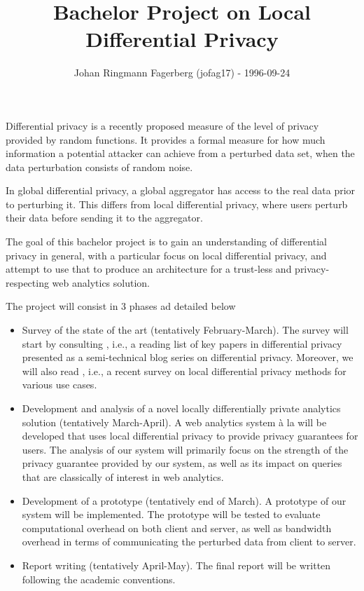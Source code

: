 \documentclass[a4paper]{article}
\title{\vspace{-2cm}Bachelor Project on Local Differential Privacy}
\author{Johan Ringmann Fagerberg (jofag17) - 1996-09-24}
\date{}
\begin{document}
\maketitle

\begin{description}[style=nextline]
    \item[Motivation] Differential privacy is a recently proposed measure of the level of privacy provided by random functions. It provides a formal measure for how much information a potential attacker can achieve from a perturbed data set, when the data perturbation consists of random noise.
    
    In global differential privacy, a global aggregator has access to the real data prior to perturbing it. This differs from local differential privacy, where users perturb their data before sending it to the aggregator.
    
    The goal of this bachelor project is to gain an understanding of 
differential privacy in general, with a particular focus on local differential 
privacy, and attempt to use that to produce an architecture for a trust-less 
and privacy-respecting web analytics solution.

\item[Plan]
    The project will consist in 3 phases ad detailed below
    \begin{itemize}
     \item Survey of the state of the art (tentatively February-March). 
The survey will start by consulting \cite{desfontain_overview}, i.e., a reading 
list of key papers in differential privacy presented as a semi-technical blog 
series on differential privacy. Moreover, we will also read 
\cite{localdiffpriv_survey}, i.e., a recent survey on local differential privacy 
methods for various use cases.
     \item Development and analysis of a novel locally differentially private 
     analytics solution (tentatively March-April). A web analytics system à la 
     \cite{webanalytics_2012}
     will be developed that uses local differential privacy to provide privacy 
     guarantees for users. The analysis of our system will primarily focus on 
     the strength of the privacy guarantee provided by our system, as well as 
     its impact on queries that are classically of interest in web analytics.
     \item Development of a prototype (tentatively end of March). A prototype
     of our system will be implemented. The prototype will be tested to evaluate 
     computational overhead on both client and server, as well as bandwidth 
     overhead in terms of communicating the perturbed data from client to server.
\item
Report writing (tentatively April-May). The final report will be written 
following the academic conventions.
    \end{itemize}
    

\end{description}
\end{document}

